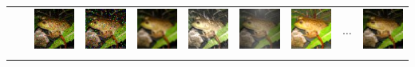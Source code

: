 \begin{table}[htbp]
\begin{tabularx}{\textwidth}{lcYYYYYYYY}
        & & \includegraphics[height=\imagequadsize, width=\imagequadsize]{Figures/Chapter2/ImageNetC/shot_noise_class2.JPEG} &\includegraphics[height=\imagequadsize, width=\imagequadsize]{Figures/Chapter2/ImageNetC/impulse_noise_class2.JPEG} & \includegraphics[height=\imagequadsize, width=\imagequadsize]{Figures/Chapter2/ImageNetC/defocus_blur_class2.JPEG} & \includegraphics[height=\imagequadsize, width=\imagequadsize]{Figures/Chapter2/ImageNetC/snow_class2.JPEG} & \includegraphics[height=\imagequadsize, width=\imagequadsize]{Figures/Chapter2/ImageNetC/fog_class2.JPEG} &
       \includegraphics[height=\imagequadsize, width=\imagequadsize]{Figures/Chapter2/ImageNetC/brightness_class2.JPEG} & $\dots$ & \includegraphics[height=\imagequadsize, width=\imagequadsize]{Figures/Chapter2/ImageNetC/pixelate_class2.JPEG} \\
       \addlinespace
         &  &  &  &  &  &  &  && \\

\end{tabularx}
\end{table}

